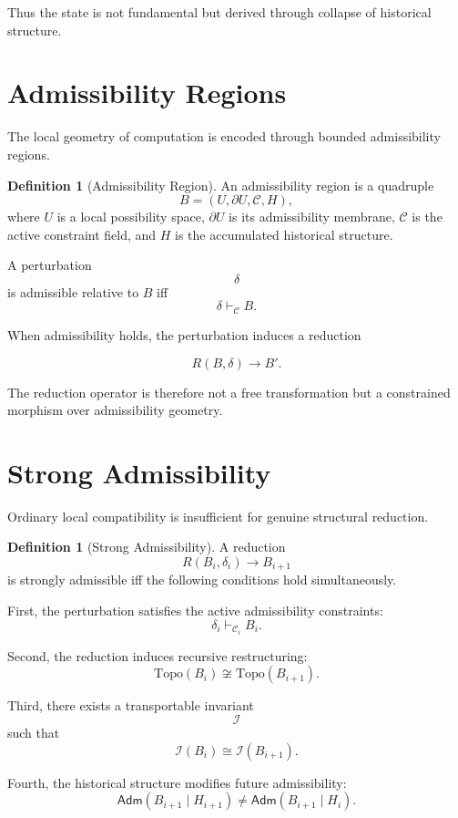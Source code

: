 \documentclass[12pt,openany]{book}
\theoremstyle{plain}
\theoremstyle{definition}
\newtheorem{definition}[theorem]{Definition}
\theoremstyle{remark}
\begin{document}
Thus the state is not fundamental but derived through collapse of
historical structure.

\section{Admissibility Regions}

The local geometry of computation is encoded through bounded
admissibility regions.

\begin{definition}[Admissibility Region]
An admissibility region is a quadruple
\[
B=(U,\partial U,\mathcal{C},H),
\]
where \(U\) is a local possibility space,
\(\partial U\) is its admissibility membrane,
\(\mathcal{C}\) is the active constraint field,
and \(H\) is the accumulated historical structure.
\end{definition}

A perturbation
\[
\delta
\]
is admissible relative to \(B\) iff
\[
\delta \vdash_{\mathcal{C}} B.
\]

When admissibility holds, the perturbation induces a reduction

\[
R(B,\delta)\to B'.
\]

The reduction operator is therefore not a free transformation but
a constrained morphism over admissibility geometry.

\section{Strong Admissibility}

Ordinary local compatibility is insufficient for genuine
structural reduction.

\begin{definition}[Strong Admissibility]
A reduction
\[
R(B_i,\delta_i)\to B_{i+1}
\]
is strongly admissible iff the following conditions hold
simultaneously.

First, the perturbation satisfies the active admissibility
constraints:
\[
\delta_i \vdash_{\mathcal{C}_i} B_i.
\]

Second, the reduction induces recursive restructuring:
\[
\mathrm{Topo}(B_i)
\not\cong
\mathrm{Topo}(B_{i+1}).
\]

Third, there exists a transportable invariant
\[
\mathcal{I}
\]
such that
\[
\mathcal{I}(B_i)
\cong
\mathcal{I}(B_{i+1}).
\]

Fourth, the historical structure modifies future admissibility:
\[
\mathsf{Adm}(B_{i+1}\mid H_{i+1})
\neq
\mathsf{Adm}(B_{i+1}\mid H_i).
\]
\end{definition}
\end{document}
